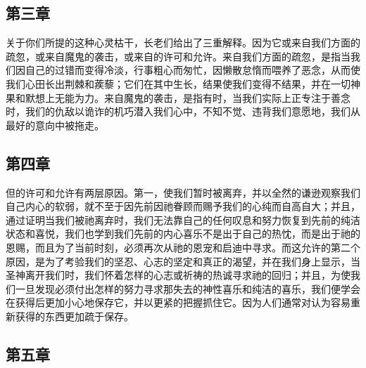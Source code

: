 
\subsection{第三章}

\par

关于你们所提的这种心灵枯干，长老们给出了三重解释。因为它或来自我们方面的疏忽，或来自魔鬼的袭击，或来自的许可和允许。来自我们方面的疏忽，是指当我们因自己的过错而变得冷淡，行事粗心而匆忙，因懒散怠惰而喂养了恶念，从而使我们心田长出荆棘和蒺藜；它们在其中生长，结果使我们变得不结果，并在一切神果和默想上无能为力。来自魔鬼的袭击，是指有时，当我们实际上正专注于善念时，我们的仇敌以诡诈的机巧潜入我们心中，不知不觉、违背我们意愿地，我们从最好的意向中被拖走。\par


\subsection{第四章}

\par

但的许可和允许有两层原因。第一，使我们暂时被离弃，并以全然的谦逊观察我们自己内心的软弱，就不至于因先前因祂眷顾而赐予我们的心纯而自高自大；并且，通过证明当我们被祂离弃时，我们无法靠自己的任何叹息和努力恢复到先前的纯洁状态和喜悦，我们也学到我们先前的内心喜乐不是出于自己的热忱，而是出于祂的恩赐，而且为了当前时刻，必须再次从祂的恩宠和启迪中寻求。而这允许的第二个原因，是为了考验我们的坚忍、心志的坚定和真正的渴望，并在我们身上显示，当圣神离开我们时，我们怀着怎样的心志或祈祷的热诚寻求祂的回归；并且，为使我们一旦发现必须付出怎样的努力寻求那失去的神性喜乐和纯洁的喜乐，我们便学会在获得后更加小心地保存它，并以更紧的把握抓住它。因为人们通常对认为容易重新获得的东西更加疏于保存。\par


\subsection{第五章}

